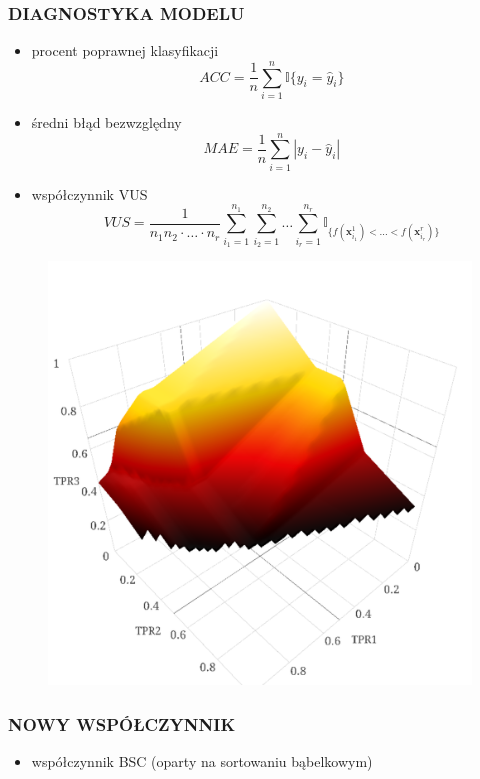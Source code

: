 \documentclass[11pt,usenames,dvipsnames,rgb,svgnames,x11names]{beamer}
\theoremstyle{plain}
\theoremstyle{definition}
\theoremstyle{remark}
\begin{document}
\begin{frame}
\frametitle{\textbf{DIAGNOSTYKA MODELU}}
\begin{itemize}
\item procent poprawnej klasyfikacji
\begin{equation*}
ACC = \frac{1}{n}\sum_{i=1}^n \mathbb{I}{\lbrace y_i=\hat{y}_i \rbrace}
\end{equation*}
\item średni błąd bezwzględny
\begin{equation*}
MAE = \frac{1}{n}\sum_{i=1}^n | y_i - \hat{y}_i | 
\end{equation*}
\item współczynnik VUS
\begin{equation*}
VUS = \dfrac{1}{n_1n_2\cdot\ldots\cdot n_r}\sum_{i_1=1}^{n_1}\sum_{i_2=1}^{n_2}\ldots\sum_{i_r=1}^{n_r}\mathbb{I}_{\lbrace f(\mathbf{x}_{i_1}^1)<\ldots<f(\mathbf{x}_{i_r}^r)\rbrace}
\end{equation*}
\end{itemize}
\end{frame}

\begin{frame}
\begin{figure}[h]
\begin{center}
\includegraphics[scale=0.35]{roc3d.png}
\end{center}
\end{figure}
\end{frame}

\begin{frame}
\frametitle{\textbf{NOWY WSPÓŁCZYNNIK}}
\begin{itemize}
\item współczynnik BSC (oparty na sortowaniu bąbelkowym)
\end{itemize}
\end{frame}
\end{document}
